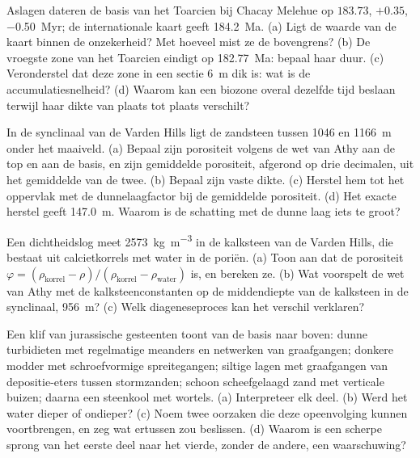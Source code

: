 \begin{exercise}[$\star\star$]\label{exo:b2:palaeoenvironments:6}
Aslagen dateren de basis van het Toarcien bij Chacay Melehue op $183.73$, $+0.35$, \qty{-0.50}{Myr};
de internationale kaart geeft \qty{184.2}{Ma}. (a) Ligt de waarde van de kaart binnen de onzekerheid?
Met hoeveel mist ze de bovengrens? (b) De vroegste zone van het Toarcien eindigt op
\qty{182.77}{Ma}: bepaal haar duur. (c) Veronderstel dat deze zone in een sectie \qty{6}{m} dik is:
wat is de accumulatiesnelheid? (d) Waarom kan een biozone overal dezelfde tijd beslaan terwijl haar
dikte van plaats tot plaats verschilt?
\end{exercise}

\begin{exercise}[$\star\star$]\label{exo:b2:palaeoenvironments:7}
In de synclinaal van de Varden Hills ligt de zandsteen tussen 1046 en \qty{1166}{m} onder het maaiveld. (a)
Bepaal zijn porositeit volgens de wet van Athy aan de top en aan de basis, en zijn gemiddelde porositeit, afgerond op
drie decimalen, uit het gemiddelde van de twee. (b) Bepaal zijn vaste dikte. (c) Herstel hem tot het
oppervlak met de dunnelaagfactor bij de gemiddelde porositeit. (d) Het exacte herstel geeft
\qty{147.0}{m}. Waarom is de schatting met de dunne laag iets te groot?
\end{exercise}

\begin{exercise}[$\star\star$]\label{exo:b2:palaeoenvironments:8}
Een dichtheidslog meet \qty{2573}{kg.m^{-3}} in de kalksteen van de Varden Hills, die bestaat uit calcietkorrels met
water in de poriën. (a) Toon aan dat de porositeit $\varphi = (\rho_{\text{korrel}} -
\rho)/(\rho_{\text{korrel}} - \rho_{\text{water}})$ is, en bereken ze. (b) Wat voorspelt de wet van Athy met de kalksteenconstanten
op de middendiepte van de kalksteen in de synclinaal, \qty{956}{m}?
(c) Welk diageneseproces kan het verschil verklaren?
\end{exercise}

\begin{exercise}[$\star\star$]\label{exo:b2:palaeoenvironments:9}
Een klif van jurassische gesteenten toont van de basis naar boven: dunne turbidieten met regelmatige meanders en netwerken
van graafgangen; donkere modder met schroefvormige spreitegangen; siltige lagen met graafgangen van depositie-eters tussen
stormzanden; schoon scheefgelaagd zand met
verticale buizen; daarna een steenkool met wortels. (a) Interpreteer elk deel. (b) Werd het water dieper of
ondieper? (c) Noem twee oorzaken die deze opeenvolging kunnen voortbrengen, en zeg wat
ertussen zou beslissen. (d) Waarom is een scherpe sprong van het eerste deel naar het vierde, zonder de andere, een
waarschuwing?
\end{exercise}

